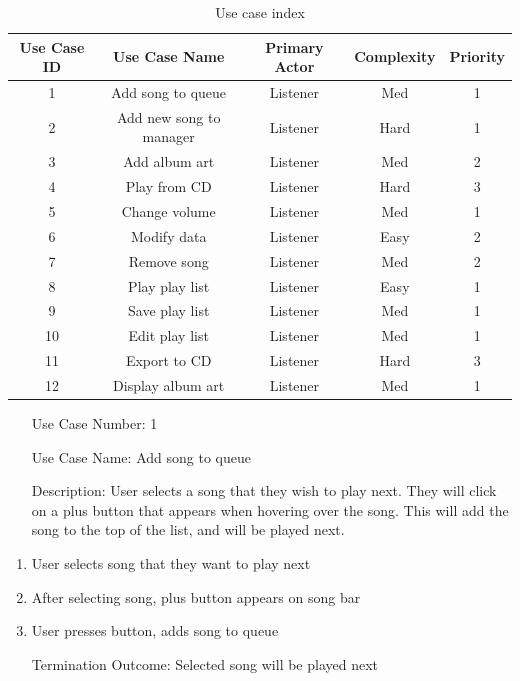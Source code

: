 \documentclass[10pt,conference,onecolumn,compsoc]{IEEEtran}
\begin{document}
\begin{table}
\centering
\begin{tabular}{|c|c|c|c|c|}
\hline
Use Case ID & Use Case Name & Primary Actor & Complexity & Priority \\
\hline \hline
1 & Add song to queue & Listener & Med & 1\\
\hline
2 & Add new song to manager & Listener & Hard & 1\\
\hline
3 & Add album art & Listener & Med & 2\\
\hline
4 & Play from CD & Listener & Hard & 3\\
\hline
5 & Change volume & Listener & Med & 1\\
\hline
6 & Modify data & Listener & Easy & 2\\
\hline
7 & Remove song & Listener & Med & 2\\
\hline
8 & Play play list & Listener & Easy & 1\\
\hline
9 & Save play list & Listener & Med & 1\\
\hline
10 & Edit play list & Listener & Med & 1\\
\hline
11 & Export to CD & Listener & Hard & 3\\
\hline
12 & Display album art & Listener & Med & 1\\
\hline

\end{tabular}
\caption{Use case index}
\label{tab:useCaseIndex}
\end{table}


\begin{itemize}
\item[Use Case Number:] 1
\item[Use Case Name:] Add song to queue
\item[Description:] User selects a song that they wish to play next. They will click on a plus button that appears when hovering over the song. This will add the song to the top of the list, and will be played next.
\end{itemize}

\begin{enumerate}
\item User selects song that they want to play next
\item After selecting song, plus button appears on song bar
\item User presses button, adds song to queue
\item[Termination Outcome:] Selected song will be played next
\end{enumerate}
\end{document}
